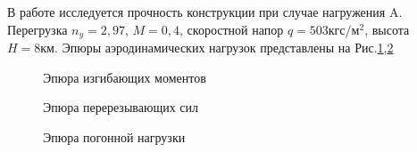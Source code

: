 В работе исследуется прочность конструкции при случае нагружения A. Перегрузка $n_y = 2,97$, $M = 0,4$, скоростной напор $q = 503 \text{кгс}/\text{м}^2$, высота $H = 8\text{км}$. Эпюры аэродинамических нагрузок представлены на Рис.\ref{fig:BendingMoments},\ref{fig:CuttingForces}



\begin{figure}[H]
\centering
\def\svgwidth{0.7\textwidth}

\caption{Эпюра изгибающих моментов}
\label{fig:BendingMoments}
\end{figure}

\begin{figure}[H]
\centering
\def\svgwidth{0.7\textwidth}

\caption{Эпюра перерезывающих сил}
\label{fig:CuttingForces}
\end{figure}

\begin{figure}[H]
\centering
\def\svgwidth{0.7\textwidth}

\caption{Эпюра погонной нагрузки}
\label{fig:DistributedLoad}
\end{figure}

